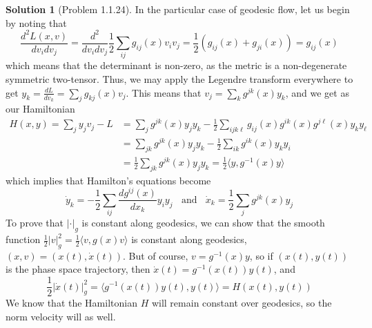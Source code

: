 \documentclass[aps,pra,showpacs,notitlepage,onecolumn,superscriptaddress,nofootinbib]{revtex4-1}
\theoremstyle{definition}
\newtheorem{solution}{Solution}[section]
\begin{document}
\begin{solution}[Problem 1.1.24]
  In the particular case of geodesic flow, let us begin by noting that
\begin{equation}
\frac{d^2 L(x, v)}{dv_i dv_j} = \frac{d^2}{dv_i dv_j} \frac{1}{2} \sum_{ij} g_{ij}(x) v_i v_j = \frac{1}{2} (g_{ij}(x) + g_{ji}(x)) = g_{ij}(x)
\end{equation}
which means that the determinant is non-zero, as the metric is a non-degenerate symmetric two-tensor. Thus, we may apply the Legendre transform
everywhere to get $y_k = \frac{dL}{dv_k} = \sum_{j} g_{kj}(x) v_j$. This means that $v_j = \sum_{k} g^{jk}(x) y_k$, and we get as our Hamiltonian
\begin{align}
H(x, y) = \sum_{j} y_j v_j - L &= \sum_{j} g^{jk}(x) y_j y_k - \frac{1}{2} \sum_{ijk \ell} g_{ij}(x) g^{ik}(x) g^{j \ell}(x) y_k y_{\ell}
\\ &= \sum_{jk} g^{jk}(x) y_j y_k - \frac{1}{2} \sum_{ik} g^{ik}(x) y_k y_{i}
\\ &= \frac{1}{2} \sum_{jk} g^{jk}(x) y_j y_k = \frac{1}{2} \langle y, g^{-1}(x) y \rangle
\end{align}
which implies that Hamilton's equations become
\begin{equation}
\dot{y}_k = -\frac{1}{2} \sum_{ij} \frac{d g^{ij}(x)}{dx_k} y_i y_j \ \ \ \ \text{and} \ \ \ \ \dot{x}_k = \frac{1}{2} \sum_{j} g^{jk}(x) y_j
\end{equation}
To prove that $|\cdot|_g$ is constant along geodesics, we can show that the smooth function $\frac{1}{2} |v|^2_g = \frac{1}{2} \langle v, g(x) v \rangle$ is constant along geodesics, $(x, v) = (x(t), \dot{x}(t))$.
But of course, $v = g^{-1}(x) y$, so if $(x(t), y(t))$ is the phase space trajectory, then $\dot{x}(t) = g^{-1}(x(t)) y(t)$, and
\begin{equation}
\frac{1}{2} |\dot{x}(t)|^2_g = \langle g^{-1}(x(t)) y(t), y(t) \rangle = H(x(t), y(t))
\end{equation}
We know that the Hamiltonian $H$ will remain constant over geodesics, so the norm velocity will as well.
  \end{solution}
\end{document}
